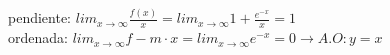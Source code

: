 \documentclass[addpoints,spanish, 12pt,a4paper]{exam}
\begin{document}
\begin{questions}
\begin{parts}
\begin{solution}
pendiente: $lim_{x \to \infty}\frac{f(x)}{x}=lim_{x \to \infty}1+ \frac{e^{-x}}{x} = 1$ \\
ordenada: $lim_{x \to \infty}f-m\cdot x=lim_{x \to \infty}e^{-x}=0 \to A.O: y=x$

\end{solution}


\end{parts}
\addpoints

\end{questions}
\end{document}
